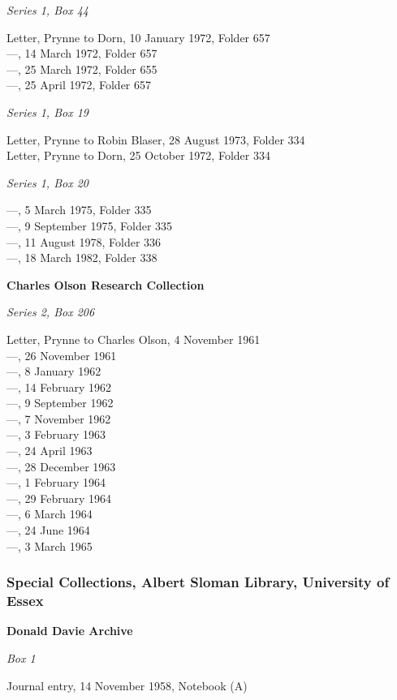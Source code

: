 \documentclass[]{article}
\begin{document}
\emph{Series 1, Box 44}

Letter, Prynne to Dorn, 10 January 1972, Folder 657\\
---, 14 March 1972, Folder 657\\
---, 25 March 1972, Folder 655\\
---, 25 April 1972, Folder 657

\emph{Series 1, Box 19}

Letter, Prynne to Robin Blaser, 28 August 1973, Folder 334\\
Letter, Prynne to Dorn, 25 October 1972, Folder 334

\emph{Series 1, Box 20}

---, 5 March 1975, Folder 335\\
---, 9 September 1975, Folder 335\\
---, 11 August 1978, Folder 336\\
---, 18 March 1982, Folder 338

\textbf{Charles Olson Research Collection}

\emph{Series 2, Box 206}

Letter, Prynne to Charles Olson, 4 November 1961\\
---, 26 November 1961\\
---, 8 January 1962\\
---, 14 February 1962\\
---, 9 September 1962\\
---, 7 November 1962\\
---, 3 February 1963\\
---, 24 April 1963\\
---, 28 December 1963\\
---, 1 February 1964\\
---, 29 February 1964\\
---, 6 March 1964\\
---, 24 June 1964\\
---, 3 March 1965

\subsubsection{Special Collections, Albert Sloman Library, University of
Essex}\label{special-collections-albert-sloman-library-university-of-essex}

\textbf{Donald Davie Archive}

\emph{Box 1}

Journal entry, 14 November 1958, Notebook (A)
\end{document}
